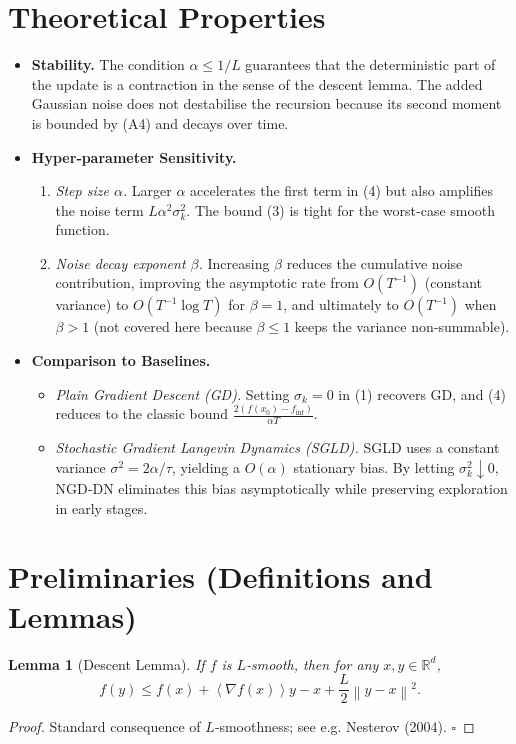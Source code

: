 \documentclass{article}
\newtheorem{lemma}{Lemma}
\newcommand{\norm}[1]{\left\lVert #1\right\rVert}
\newcommand{\inner}[1]{\left\langle #1\right\rangle}
\newcommand{\R}{\mathbb{R}}
\begin{document}
\section*{Theoretical Properties}
\begin{itemize}
\item \textbf{Stability.} The condition $\alpha\le 1/L$ guarantees that the deterministic part of the update is a contraction in the sense of the descent lemma. The added Gaussian noise does not destabilise the recursion because its second moment is bounded by (A4) and decays over time.
\item \textbf{Hyper‑parameter Sensitivity.}
    \begin{enumerate}[label=(\alph*)]
        \item \emph{Step size $\alpha$.} Larger $\alpha$ accelerates the first term in (4) but also amplifies the noise term $L\alpha^{2}\sigma_{k}^{2}$. The bound (3) is tight for the worst‑case smooth function.
        \item \emph{Noise decay exponent $\beta$.} Increasing $\beta$ reduces the cumulative noise contribution, improving the asymptotic rate from $O(T^{-1})$ (constant variance) to $O(T^{-1}\log T)$ for $\beta=1$, and ultimately to $O(T^{-1})$ when $\beta>1$ (not covered here because $\beta\le1$ keeps the variance non‑summable).
    \end{enumerate}
\item \textbf{Comparison to Baselines.}
    \begin{itemize}
        \item \emph{Plain Gradient Descent (GD).} Setting $\sigma_{k}=0$ in (1) recovers GD, and (4) reduces to the classic bound $\frac{2(f(x_{0})-f_{\inf})}{\alpha T}$.
        \item \emph{Stochastic Gradient Langevin Dynamics (SGLD).} SGLD uses a constant variance $\sigma^{2}=2\alpha/\tau$, yielding a $O(\alpha)$ stationary bias. By letting $\sigma_{k}^{2}\downarrow0$, NGD‑DN eliminates this bias asymptotically while preserving exploration in early stages.
    \end{itemize}
\end{itemize}

\section*{Preliminaries (Definitions and Lemmas)}
\begin{lemma}[Descent Lemma]\label{lem:descent}
If $f$ is $L$‑smooth, then for any $x,y\in\R^{d}$,
\[
f(y)\le f(x)+\inner{\nabla f(x)}{y-x}
+\frac{L}{2}\norm{y-x}^{2}.
\tag{6}
\]
\end{lemma}
\begin{proof}
Standard consequence of $L$‑smoothness; see e.g. Nesterov (2004). \hfill $\square$
\end{proof}
\end{document}
